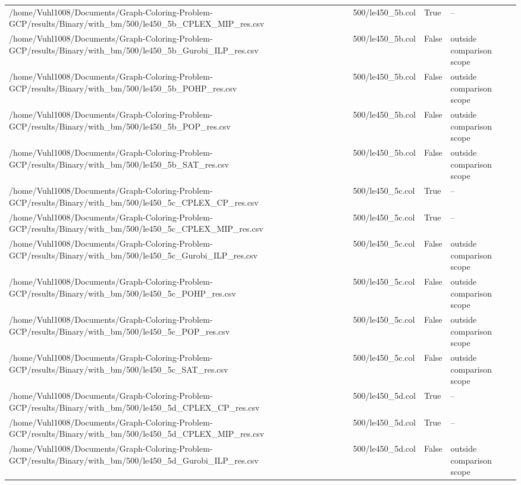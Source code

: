 \begin{table}[htbp]
\begin{tabular}{llll}
/home/Vuhl1008/Documents/Graph-Coloring-Problem-GCP/results/Binary/with\_bm/500/le450\_5b\_CPLEX\_MIP\_res.csv & 500/le450\_5b.col & True & -- \\
/home/Vuhl1008/Documents/Graph-Coloring-Problem-GCP/results/Binary/with\_bm/500/le450\_5b\_Gurobi\_ILP\_res.csv & 500/le450\_5b.col & False & outside comparison scope \\
/home/Vuhl1008/Documents/Graph-Coloring-Problem-GCP/results/Binary/with\_bm/500/le450\_5b\_POHP\_res.csv & 500/le450\_5b.col & False & outside comparison scope \\
/home/Vuhl1008/Documents/Graph-Coloring-Problem-GCP/results/Binary/with\_bm/500/le450\_5b\_POP\_res.csv & 500/le450\_5b.col & False & outside comparison scope \\
/home/Vuhl1008/Documents/Graph-Coloring-Problem-GCP/results/Binary/with\_bm/500/le450\_5b\_SAT\_res.csv & 500/le450\_5b.col & False & outside comparison scope \\
/home/Vuhl1008/Documents/Graph-Coloring-Problem-GCP/results/Binary/with\_bm/500/le450\_5c\_CPLEX\_CP\_res.csv & 500/le450\_5c.col & True & -- \\
/home/Vuhl1008/Documents/Graph-Coloring-Problem-GCP/results/Binary/with\_bm/500/le450\_5c\_CPLEX\_MIP\_res.csv & 500/le450\_5c.col & True & -- \\
/home/Vuhl1008/Documents/Graph-Coloring-Problem-GCP/results/Binary/with\_bm/500/le450\_5c\_Gurobi\_ILP\_res.csv & 500/le450\_5c.col & False & outside comparison scope \\
/home/Vuhl1008/Documents/Graph-Coloring-Problem-GCP/results/Binary/with\_bm/500/le450\_5c\_POHP\_res.csv & 500/le450\_5c.col & False & outside comparison scope \\
/home/Vuhl1008/Documents/Graph-Coloring-Problem-GCP/results/Binary/with\_bm/500/le450\_5c\_POP\_res.csv & 500/le450\_5c.col & False & outside comparison scope \\
/home/Vuhl1008/Documents/Graph-Coloring-Problem-GCP/results/Binary/with\_bm/500/le450\_5c\_SAT\_res.csv & 500/le450\_5c.col & False & outside comparison scope \\
/home/Vuhl1008/Documents/Graph-Coloring-Problem-GCP/results/Binary/with\_bm/500/le450\_5d\_CPLEX\_CP\_res.csv & 500/le450\_5d.col & True & -- \\
/home/Vuhl1008/Documents/Graph-Coloring-Problem-GCP/results/Binary/with\_bm/500/le450\_5d\_CPLEX\_MIP\_res.csv & 500/le450\_5d.col & True & -- \\
/home/Vuhl1008/Documents/Graph-Coloring-Problem-GCP/results/Binary/with\_bm/500/le450\_5d\_Gurobi\_ILP\_res.csv & 500/le450\_5d.col & False & outside comparison scope \\

\end{tabular}
\end{table}
